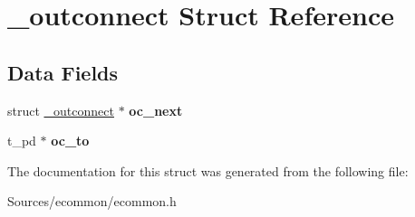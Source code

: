 \hypertarget{struct__outconnect}{\section{\-\_\-outconnect Struct Reference}
\label{struct__outconnect}
}
\subsection*{Data Fields}
\begin{DoxyCompactItemize}
\item 
\hypertarget{struct__outconnect_adbea08b41c0c8fe91283ea49fc0d4cfc}{struct \hyperlink{struct__outconnect}{\-\_\-outconnect} $\ast$ {\bfseries oc\-\_\-next}}\label{struct__outconnect_adbea08b41c0c8fe91283ea49fc0d4cfc}

\item 
\hypertarget{struct__outconnect_a9883a86f4e61a89103c9b67a9b415385}{t\-\_\-pd $\ast$ {\bfseries oc\-\_\-to}}\label{struct__outconnect_a9883a86f4e61a89103c9b67a9b415385}

\end{DoxyCompactItemize}


The documentation for this struct was generated from the following file\-:\begin{DoxyCompactItemize}
\item 
Sources/ecommon/ecommon.\-h\end{DoxyCompactItemize}
